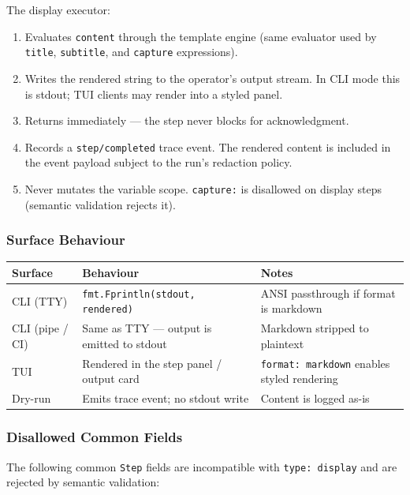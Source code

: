 The display executor:
\begin{enumerate}
  \item Evaluates \texttt{content} through the template engine (same evaluator used by
        \texttt{title}, \texttt{subtitle}, and \texttt{capture} expressions).
  \item Writes the rendered string to the operator's output stream.
        In CLI mode this is stdout; TUI clients may render into a styled panel.
  \item Returns immediately — the step never blocks for acknowledgment.
  \item Records a \texttt{step/completed} trace event. The rendered content is included
        in the event payload subject to the run's redaction policy.
  \item Never mutates the variable scope. \texttt{capture:} is disallowed on display steps
        (semantic validation rejects it).
\end{enumerate}

\subsubsection*{Surface Behaviour}

\begin{center}
\begin{tabular}{|l|p{5cm}|p{5cm}|}
\hline
\textbf{Surface} & \textbf{Behaviour} & \textbf{Notes} \\
\hline
CLI (TTY) & \texttt{fmt.Fprintln(stdout, rendered)} & ANSI passthrough if format is markdown \\
\hline
CLI (pipe / CI) & Same as TTY — output is emitted to stdout & Markdown stripped to plaintext \\
\hline
TUI & Rendered in the step panel / output card & \texttt{format: markdown} enables styled rendering \\
\hline
Dry-run & Emits trace event; no stdout write & Content is logged as-is \\
\hline
\end{tabular}
\end{center}

\subsubsection*{Disallowed Common Fields}

The following common \texttt{Step} fields are incompatible with \texttt{type: display}
and are rejected by semantic validation:

